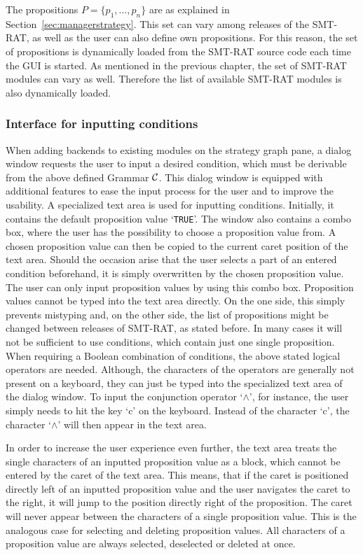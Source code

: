 The propositions $P = \{p_1, \dots, p_n\}$ are as explained in Section~\ref{sec:managerstrategy}. 
This set can vary among releases of the SMT-RAT, as well as the user can also 
define own propositions. For this reason, the set of propositions is dynamically 
loaded from the SMT-RAT source code each time the GUI is started. As mentioned in 
the previous chapter, the set of SMT-RAT modules can vary as well. Therefore the 
list of available SMT-RAT modules is also dynamically loaded.

\subsubsection{Interface for inputting conditions}
\label{subsec:improved_interface_for_inputting_conditions}
When adding backends to existing modules on the strategy graph pane, a dialog window
requests the user to input a desired condition, which must be derivable from the 
above defined Grammar $\cal C$. This dialog window is equipped with additional 
features to ease the input process for the user and to improve the usability. 
A specialized text area is used for inputting conditions. Initially, it contains
the default proposition value `\texttt{TRUE}'. The window also contains a combo box, 
where the user has the possibility to choose a proposition value from. A chosen 
proposition value can then be copied to the current caret position of the text area. 
Should the occasion arise that the user selects a part of an entered condition 
beforehand, it is simply overwritten by the chosen proposition value. The user can
only input proposition values by using this combo box. Proposition values cannot
be typed into the text area directly. On the one side, this simply prevents mistyping
and, on the other side, the list of propositions might be changed between releases
of SMT-RAT, as stated before. In many cases it will not be sufficient to use conditions,
which contain just one single proposition. When requiring a Boolean combination of 
conditions, the above stated logical operators are needed. Although, the 
characters of the operators are generally not present on a keyboard, they can just
be typed into the specialized text area of the dialog window. To input the 
conjunction operator `$\land$', for instance, the user simply needs to hit the 
key `c' on the keyboard. Instead of the character `c', the character `$\land$' 
will then appear in the text area.

In order to increase the user experience even further, the text area treats the
single characters of an inputted proposition value as a block, which cannot be
entered by the caret of the text area. This means, that if the caret is positioned
directly left of an inputted proposition value and the user navigates the caret to
the right, it will jump to the position directly right of the proposition. The
caret will never appear between the characters of a single proposition value. This
is the analogous case for selecting and deleting proposition values. All characters
of a proposition value are always selected, deselected or deleted at once.

